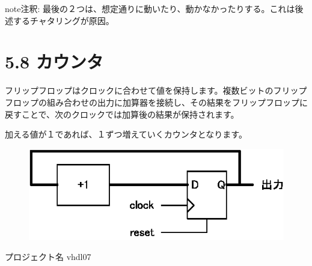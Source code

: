 \documentclass[letterpaper,10pt,dvipdfmx]{sphinxmanual}
\begin{document}
\begin{notice}{note}{注釈:}
最後の２つは、想定通りに動いたり、動かなかったりする。これは後述するチャタリングが原因。
\end{notice}


\section{5.8 カウンタ}
\label{05_try:id14}
フリップフロップはクロックに合わせて値を保持します。複数ビットのフリップフロップの組み合わせの出力に加算器を接続し、その結果をフリップフロップに戻すことで、次のクロックでは加算後の結果が保持されます。

加える値が１であれば、１ずつ増えていくカウンタとなります。
\begin{figure}[htbp]
\centering

\includegraphics{figure15.eps}
\end{figure}

プロジェクト名 vhdl07
\end{document}
